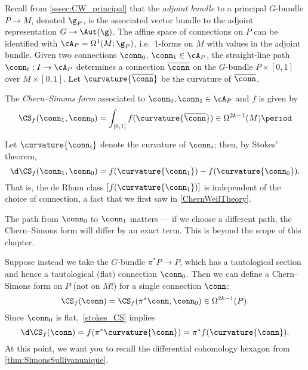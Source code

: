 Recall from \cref{sssec:CW_principal} that the \textit{adjoint bundle} to a principal $G$-bundle $P\to M$, denoted
$\g_P$, is the associated vector bundle to the adjoint representation $G\to\Aut(\g)$. The affine space of
connections on $P$ can be identified with $\cA_P=\Omega^1(M;\g_P)$, i.e.\ 1-forms on $M$ with values in the
adjoint bundle. Given two connections $\conn_0$, $\conn_1\in\cA_P$, the straight-line path
$\conn_t:I\rightarrow \cA_P$ determines a connection $\overline\conn$ on the $G$-bundle $P\times [0,1]$ over
$M\times[0,1]$. Let $\curvature{\overline\conn}$ be the curvature of $\overline\conn$.
\begin{defn}
The \textit{Chern--Simons form} associated to $\conn_0,\conn_1\in\cA_P$ and $f $ is given by
\[\CS_{f }(\conn_1, \conn_0)=\int_{[0,1]}f(\curvature{\overline\conn})\in\Omega^{2k-1}(M)\period\]
\end{defn}
Let $\curvature{\conn_i}$ denote the curvature of $\conn_i$; then, by Stokes' theorem,
\begin{equation}
\label{stokes_CS}
\d\CS_{f }(\conn_1, \conn_0)= f(\curvature{\conn_1})-f(\curvature{\conn_0}).
\end{equation}
That is, the de Rham class $[f(\curvature{\conn_1})]$ is independent of the choice of connection, a fact that we first saw in
\cref{ChernWeilTheory}.
\begin{remark}
The path from $\conn_0$ to $\conn_1$ matters --- if we choose a different path, the Chern--Simons form will
differ by an exact term. This is beyond the scope of this chapter.
\end{remark}
Suppose instead we take the $G$-bundle $\pi^*P\rightarrow P$, which has a tautological section and hence a
tautological (flat) connection $\conn_0$. Then we can define a Chern--Simons form on $P$ (not on $M$!) for a single
connection $\conn$:
\begin{equation}
\label{total_space_CS}
\CS_{f }(\conn)=\CS_{f }(\pi^*\conn, \conn_0)\in \Omega^{2k-1}(P).
\end{equation}
Since $\conn_0$ is flat,~\eqref{stokes_CS} implies
\begin{equation}
\label{chern_simons_differential}
	\d\CS_{f }(\conn )= f(\pi^*\curvature{\conn})=\pi^*f(\curvature{\conn}).
\end{equation}
At this point, we want you to recall the differential cohomology hexagon from \cref{thm:SimonsSullivanunique}.
%
